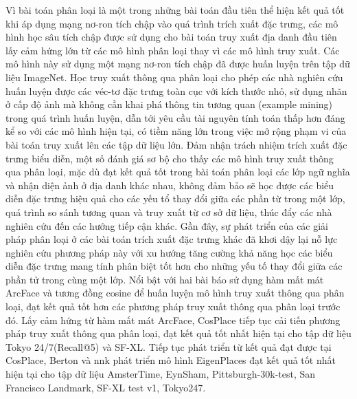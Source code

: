 Vì bài toán phân loại là một trong những bài toán đầu tiên thể hiện kết quả tốt khi áp dụng mạng nơ-ron tích chập vào quá trình trích xuất đặc trưng, các mô hình học sâu tích chập được sử dụng cho bài toán truy xuất địa danh đầu tiên lấy cảm hứng lớn từ các mô hình phân loại thay vì các mô hình truy xuất. Các mô hình này sử dụng một mạng nơ-ron tích chập đã được huấn luyện trên tập dữ liệu ImageNet\cite{krizhevsky2012imagenet}. Học truy xuất thông qua phân loại cho phép các nhà nghiên cứu huấn luyện được các véc-tơ đặc trưng toàn cục với kích thước nhỏ, sử dụng nhãn ở cấp độ ảnh mà không cần khai phá thông tin tương quan (example mining) trong quá trình huấn luyện, dẫn tới yêu cầu tài nguyên tính toán thấp hơn đáng kể so với các mô hình hiện tại, có tiềm năng lớn trong việc mở rộng phạm vi của bài toán truy xuất lên các tập dữ liệu lớn. Đảm nhận trách nhiệm trích xuất đặc trưng biểu diễn, một số đánh giá sơ bộ cho thấy các mô hình truy xuất thông qua phân loại, mặc dù đạt kết quả tốt trong bài toán phân loại các lớp ngữ nghĩa và nhận diện ảnh ở địa danh khác nhau, không đảm bảo sẽ học được các biểu diễn đặc trưng hiệu quả cho các yếu tổ thay đổi giữa các phần từ trong một lớp, quá trình so sánh tương quan và truy xuất từ cơ sở dữ liệu\cite{arandjelovic2016netvlad, gordo2016deep, randenovic2016BoW}, thúc đẩy các nhà nghiên cứu đến các hướng tiếp cận khác. Gần đây, sự phát triển của các giải pháp phân loại ở các bài toán trích xuất đặc trưng khác đã khơi dậy lại nỗ lực nghiên cứu phương pháp này với xu hướng tăng cường khả năng học các biểu diễn đặc trưng mang tính phân biệt tốt hơn cho những yếu tố thay đổi giữa các phần tử trong cùng một lớp. Nổi bật với hai bài báo \cite{cao2020unifying, yokoo2020twostage} sử dụng hàm mất mát ArcFace\cite{Deng_2022} và tương đồng cosine để huấn luyện mô hình truy xuất thông qua phân loại, đạt kết quả tốt hơn các phương pháp truy xuất thông qua phân loại trước đó. Lấy cảm hứng từ hàm mất mát ArcFace\cite{Deng_2022}, CosPlace\cite{berton2022rethinking} tiếp tục cải tiến phương pháp truy xuất thông qua phân loại, đạt kết quả tốt nhất hiện tại cho tập dữ liệu Tokyo 24/7(Recall@5)\cite{Torii-CVPR2015} và SF-XL\cite{berton2022rethinking}. Tiếp tục phát triển từ kết quả đạt được tại CosPlace\cite{berton2022rethinking}, Berton và nnk phát triển mô hình EigenPlaces\cite{berton2023eigenplaces} đạt kết quả tốt nhất hiện tại cho tập dữ liệu AmsterTime\cite{yildiz2022amstertime}, EynSham\cite{eynsham2009}, Pittsburgh-30k-test\cite{6618963}, San Francisco Landmark\cite{5995610}, SF-XL test v1\cite{berton2022rethinking}, Tokyo247\cite{Torii-CVPR2015}.

